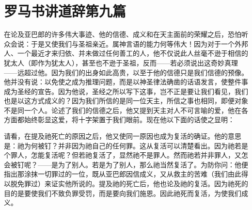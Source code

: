 

\section{罗马书讲道辞第九篇}

\par

\par

在论及亚巴郎的许多伟大事迹、他的信德、成义和在天主面前的荣耀之后，恐怕听众会说：于是又使我们与圣祖亲近。属神言语的能力何等伟大！因为对于一个外邦人、一个最近才来归依、并未做过任何善工的人，他不仅说此人丝毫不逊于相信的犹太人（即作为犹太人），甚至也不逊于圣祖，反而——若必须说出这奇妙真理——远超过他。因为我们的出身如此高贵，以至于他的信德只是我们信德的预像。他并没有说：以免使之成为推理问题，而是以神圣律法确凿的话语发言，使整件事成为圣经的宣告。因为他说，圣经之所以写下这事，岂不正是要让我们看见，我们也是以这方式成义的？因为我们所信的是同一位天主，所信之事也相同，即便对象不是同一个人。论述了我们的信德之后，他又提到天主对人不可言喻的爱，他在各方面都始终彰显这爱，将十字架置于我们眼前。现在他以下面的话使之显明：\par

 \par

请看，在提及祂死亡的原因之后，他又使同一原因也成为复活的确证。他的意思是：祂为何被钉？并非因为祂自己的任何罪。这从复活可以清楚看出。因为祂若是个罪人，怎能复活呢？但若祂复活了，显然祂不是罪人。然而祂若并非罪人，又怎会被钉呢？——是为了别人。若是为了别人，那么祂当然复活了。为防你问：他便指出那涂抹一切罪过的一位，既从亚巴郎因信成义，又从救主的苦难（我们由此得以脱免罪过）来证实他所说的。提及祂的死亡后，他也论及祂的复活。因为祂死的目的是要使我们不致负罪受罚，而是要向我们施恩。因此祂死而复活，为使我们成义。\par

